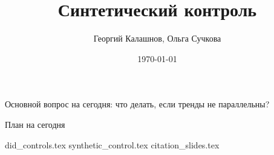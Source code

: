 \title{Синтетический контроль}
\author[Георгий Калашнов, Ольга Сучкова]{Георгий Калашнов, Ольга Сучкова}
\date{\today}



\begin{frame}
  \titlepage
  
\end{frame}

\begin{frame}
    Основной вопрос на сегодня: что делать, если тренды не параллельны?
\end{frame}


\begin{frame}{План на сегодня} 
\tableofcontents
\end{frame}

{did_controls.tex}
{synthetic_control.tex}
{citation_slides.tex}



